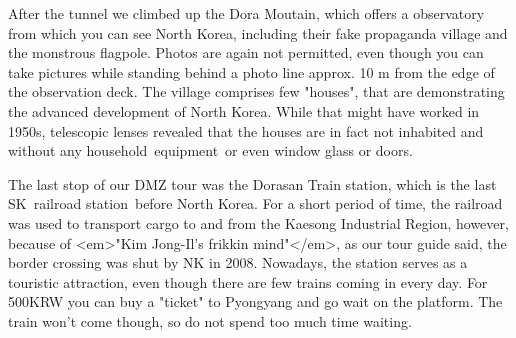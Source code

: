 \begin{post}
\begin{content}
After the tunnel we climbed up the Dora Moutain, which offers a observatory from which you can see North Korea, including their fake propaganda village and the monstrous flagpole. Photos are again not permitted, even though you can take pictures while standing behind a photo line approx. 10 m from the edge of the observation deck. The village comprises few "houses", that are demonstrating the advanced development of North Korea. While that might have worked in 1950s, telescopic lenses revealed that the houses are in fact not inhabited and without any household equipment or even window glass or doors.

\begin{figure}[h]
\centering{}
\end{figure}

The last stop of our DMZ tour was the Dorasan Train station, which is the last SK railroad station before North Korea. For a short period of time, the railroad was used to transport cargo to and from the Kaesong Industrial Region, however, because of <em>"Kim Jong-Il's frikkin mind"</em>, as our tour guide said, the border crossing was shut by NK in 2008. Nowadays, the station serves as a touristic attraction, even though there are few trains coming in every day. For 500KRW you can buy a "ticket" to Pyongyang and go wait on the platform. The train won't come though, so do not spend too much time waiting.

\begin{figure}[h]
\centering{}
\end{figure}



\end{content}
\end{post}
